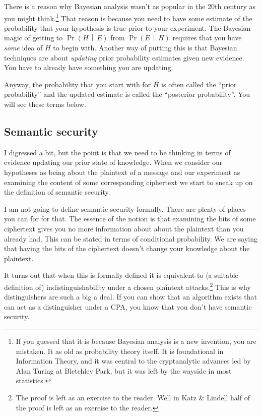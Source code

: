 \documentclass[11pt]{article}
\newcommand{\prob}[1]{\ensuremath{\operatorname{Pr}\left( #1 \right)}}
\newcommand{\condprob}[2]{\prob{#1\, \middle|\, #2}}
\begin{document}
There is a reason why Bayesian analysis wasn't as popular in the 20th century as you might think.\footnote{%
    If you guessed that it is because Bayesian analysis is a new invention, you are mistaken. It as old as probability theory itself. 
    It is foundational in Information Theory,
    and it was central to the cryptanalytic advances led by Alan Turing at Bletchley Park, but it was left by the wayside in most statistics.
}
That reason is because you need to have some estimate of the probability that your hypothesis is true prior to your experiment.
The Bayesian magic of getting to \condprob{H}{E} from \condprob{E}{H} requires that you have \emph{some} idea of $H$ to begin with.
Another way of putting this is that Bayesian techniques are about \emph{updating} prior probability estimates given new evidence.
You have to already have something you are updating.

Anyway, the probability that you start with for $H$ is often called the \enquote{prior probability} and the updated estimate is called the \enquote{posterior probability}. You will see these terms below.

\subsection{Semantic security}

I digressed a bit, but the point is that we need to be thinking in terms of evidence updating our prior state of knowledge.
When we consider our hypotheses as being about the plaintext of a message and our experiment as examining the content of some corresponding ciphertext we start to sneak up on the definition of semantic security.

I am not going to define semantic security formally. There are plenty of places you can for for that. The essence of the notion is that examining the bits of some ciphertext gives you no more information about about the plaintext than you already had. This can be stated in terms of conditional probability.
We are saying that having the bits of the ciphertext doesn't change your knowledge about the plaintext.

It turns out that when this is formally defined it is equivalent to
(a suitable definition of) indistinguishability under a
chosen plaintext attacks.\footnote{%
    The proof is left as an exercise to the reader. Well in Katz \& Lindell half of the proof is left as an exercise to the reader.
}
This is why distinguishers are such a big a deal.
If you can show that an algorithm exists that can act as a distinguisher under a CPA, you know that you don't have semantic security.
\end{document}
